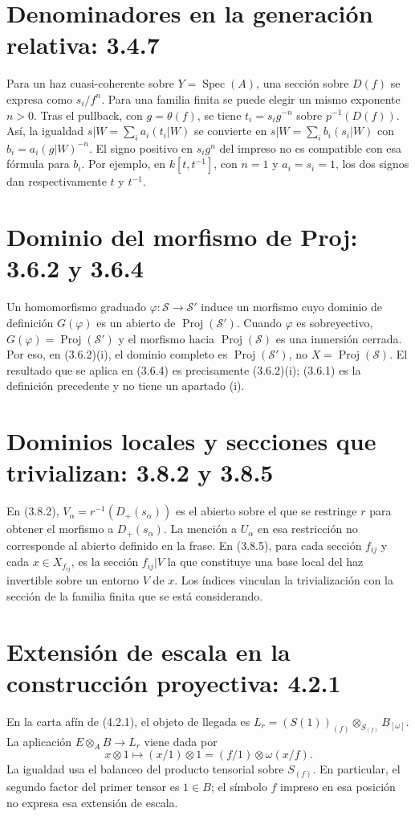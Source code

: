 \documentclass[11pt,a4paper]{article}
\DeclareMathOperator{\Spec}{Spec}
\DeclareMathOperator{\Proj}{Proj}
\begin{document}
\section{Denominadores en la generación relativa: 3.4.7}
Para un haz cuasi-coherente sobre $Y=\Spec(A)$, una sección sobre
$D(f)$ se expresa como $s_i/f^n$. Para una familia finita se puede
elegir un mismo exponente $n>0$. Tras el pullback, con $g=\theta(f)$,
se tiene $t_i=s_i g^{-n}$ sobre $p^{-1}(D(f))$.
Así, la igualdad $s|W=\sum_i a_i(t_i|W)$ se convierte en
$s|W=\sum_i b_i(s_i|W)$ con $b_i=a_i(g|W)^{-n}$.
El signo positivo en $s_i g^n$ del impreso no es compatible con
esa fórmula para $b_i$. Por ejemplo, en $k[t,t^{-1}]$, con $n=1$
y $a_i=s_i=1$, los dos signos dan respectivamente $t$ y $t^{-1}$.

\section{Dominio del morfismo de Proj: 3.6.2 y 3.6.4}
Un homomorfismo graduado $\varphi:\mathcal S\to\mathcal S'$
induce un morfismo cuyo dominio de definición $G(\varphi)$ es un
abierto de $\Proj(\mathcal S')$. Cuando $\varphi$ es sobreyectivo,
$G(\varphi)=\Proj(\mathcal S')$ y el morfismo hacia
$\Proj(\mathcal S)$ es una inmersión cerrada. Por eso, en (3.6.2)(i),
el dominio completo es $\Proj(\mathcal S')$, no $X=\Proj(\mathcal S)$.
El resultado que se aplica en (3.6.4) es precisamente (3.6.2)(i);
(3.6.1) es la definición precedente y no tiene un apartado (i).

\section{Dominios locales y secciones que trivializan: 3.8.2 y 3.8.5}
En (3.8.2), $V_\alpha=r^{-1}(D_+(s_\alpha))$ es el abierto sobre
el que se restringe $r$ para obtener el morfismo a $D_+(s_\alpha)$.
La mención a $U_\alpha$ en esa restricción no corresponde al abierto
definido en la frase. En (3.8.5), para cada sección $f_{ij}$ y cada
$x\in X_{f_{ij}}$, es la sección $f_{ij}|V$ la que constituye una
base local del haz invertible sobre un entorno $V$ de $x$.
Los índices vinculan la trivialización con la sección de la familia
finita que se está considerando.

\section{Extensión de escala en la construcción proyectiva: 4.2.1}
En la carta afín de (4.2.1), el objeto de llegada es
$L_r=(S(1))_{(f)}\otimes_{S_{(f)}}B_{[\omega]}$.
La aplicación $E\otimes_A B\to L_r$ viene dada por
\[
x\otimes1\longmapsto (x/1)\otimes1
                 =(f/1)\otimes\omega(x/f).
\]
La igualdad usa el balanceo del producto tensorial sobre $S_{(f)}$.
En particular, el segundo factor del primer tensor es $1\in B$;
el símbolo $f$ impreso en esa posición no expresa esa extensión
de escala.
\end{document}
